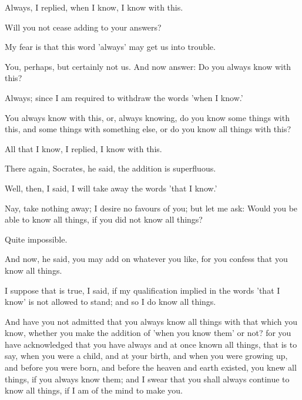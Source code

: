 \documentclass[11pt,letter]{article}
\begin{document}
\par  Always, I replied, when I know, I know with this.

\par  Will you not cease adding to your answers?

\par  My fear is that this word 'always' may get us into trouble.

\par  You, perhaps, but certainly not us. And now answer: Do you always know with this?

\par  Always; since I am required to withdraw the words 'when I know.'

\par  You always know with this, or, always knowing, do you know some things with this, and some things with something else, or do you know all things with this?

\par  All that I know, I replied, I know with this.

\par  There again, Socrates, he said, the addition is superfluous.

\par  Well, then, I said, I will take away the words 'that I know.'

\par  Nay, take nothing away; I desire no favours of you; but let me ask: Would you be able to know all things, if you did not know all things?

\par  Quite impossible.

\par  And now, he said, you may add on whatever you like, for you confess that you know all things.

\par  I suppose that is true, I said, if my qualification implied in the words 'that I know' is not allowed to stand; and so I do know all things.

\par  And have you not admitted that you always know all things with that which you know, whether you make the addition of 'when you know them' or not? for you have acknowledged that you have always and at once known all things, that is to say, when you were a child, and at your birth, and when you were growing up, and before you were born, and before the heaven and earth existed, you knew all things, if you always know them; and I swear that you shall always continue to know all things, if I am of the mind to make you.
\end{document}
